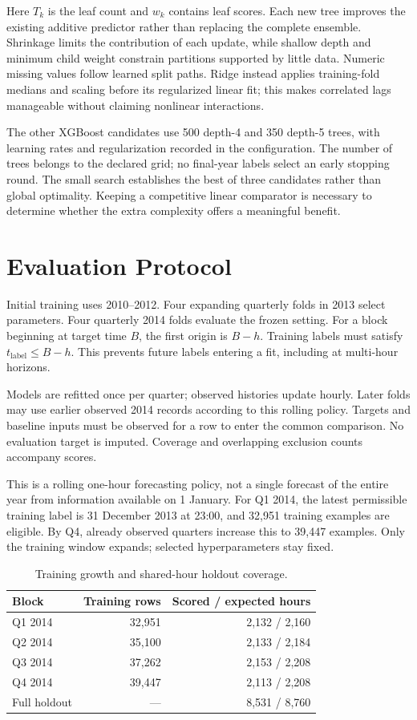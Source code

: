 \documentclass[conference]{IEEEtran}
\begin{document}
Here $T_k$ is the leaf count and $w_k$ contains leaf scores. Each new tree improves the existing additive predictor rather than replacing the complete ensemble. Shrinkage limits the contribution of each update, while shallow depth and minimum child weight constrain partitions supported by little data. Numeric missing values follow learned split paths. Ridge instead applies training-fold medians and scaling before its regularized linear fit; this makes correlated lags manageable without claiming nonlinear interactions.

The other XGBoost candidates use 500 depth-4 and 350 depth-5 trees, with learning rates and regularization recorded in the configuration. The number of trees belongs to the declared grid; no final-year labels select an early stopping round. The small search establishes the best of three candidates rather than global optimality. Keeping a competitive linear comparator is necessary to determine whether the extra complexity offers a meaningful benefit.

\section{Evaluation Protocol}
Initial training uses 2010--2012. Four expanding quarterly folds in 2013 select parameters. Four quarterly 2014 folds evaluate the frozen setting. For a block beginning at target time $B$, the first origin is $B-h$. Training labels must satisfy $t_{\mathrm{label}}\le B-h$. This prevents future labels entering a fit, including at multi-hour horizons.

Models are refitted once per quarter; observed histories update hourly. Later folds may use earlier observed 2014 records according to this rolling policy. Targets and baseline inputs must be observed for a row to enter the common comparison. No evaluation target is imputed. Coverage and overlapping exclusion counts accompany scores.

This is a rolling one-hour forecasting policy, not a single forecast of the entire year from information available on 1 January. For Q1 2014, the latest permissible training label is 31 December 2013 at 23:00, and 32,951 training examples are eligible. By Q4, already observed quarters increase this to 39,447 examples. Only the training window expands; selected hyperparameters stay fixed.

\begin{table}[ht]
\centering
\caption{Training growth and shared-hour holdout coverage.}
\label{tab:coverage}
\begin{tabular}{lrr}
\toprule
Block & Training rows & Scored / expected hours\\\midrule
Q1 2014 & 32,951 & 2,132 / 2,160\\
Q2 2014 & 35,100 & 2,133 / 2,184\\
Q3 2014 & 37,262 & 2,153 / 2,208\\
Q4 2014 & 39,447 & 2,113 / 2,208\\\midrule
Full holdout & --- & 8,531 / 8,760\\\bottomrule
\end{tabular}
\end{table}
\end{document}
